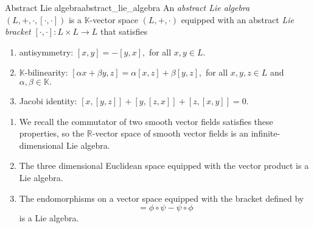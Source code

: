 \begin{definition}{Abstract Lie algebra}{abstract_lie_algebra}
    An \emph{abstract Lie algebra} \(\left(L, +, \cdot, [\cdot, \cdot]\right)\) is a \(\mathbb{K}\)-vector space \((L, + , \cdot)\) equipped with an abstract \emph{Lie bracket} \([\cdot, \cdot] : L \times L \to L\) that satisfies
    \begin{enumerate}[label=(\alph*)]
        \item antisymmetry: \([x, y] = -[y, x],\) for all \(x, y \in L\).
        \item \(\mathbb{K}\)-bilinearity: \([\alpha x + \beta y, z] = \alpha[x,z] + \beta[y,z],\) for all \(x,y,z \in L\) and \(\alpha,\beta \in \mathbb{K}.\)
        \item Jacobi identity: \([x,[y,z]] + [y,[z,x]] + [z, [x,y]] = 0.\)
    \end{enumerate}
\end{definition}
\begin{example}
    \begin{enumerate}[label=(\alph*)]
        \item We recall the commutator of two smooth vector fields satisfies these properties, so the \(\mathbb{R}\)-vector space of smooth vector fields is an infinite-dimensional Lie algebra.
        \item The three dimensional Euclidean space equipped with the vector product is a Lie algebra.
        \item The endomorphisms on a vector space equipped with the bracket defined by
            \begin{equation*}
                [\phi,\psi] = \phi\circ\psi - \psi\circ\phi
            \end{equation*}
        is a Lie algebra.
    \end{enumerate}
\end{example}

